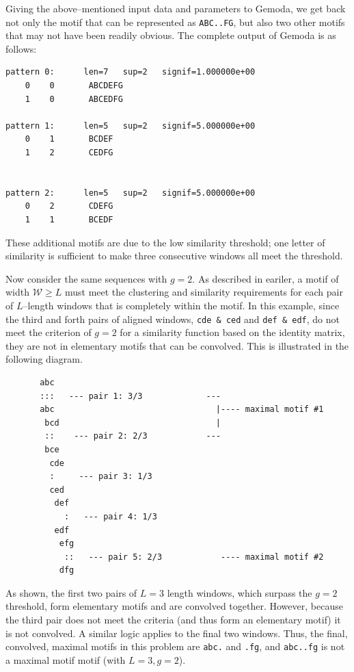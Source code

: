     Giving the above--mentioned input data and parameters to Gemoda, we get
    back not only the motif that can be represented as \texttt{ABC..FG}, but
    also two other motifs that may not have been readily obvious.  The
    complete output of Gemoda is as follows:

    \begin{verbatim}
pattern 0:      len=7   sup=2   signif=1.000000e+00
    0    0       ABCDEFG
    1    0       ABCEDFG

pattern 1:      len=5   sup=2   signif=5.000000e+00
    0    1       BCDEF
    1    2       CEDFG


pattern 2:      len=5   sup=2   signif=5.000000e+00
    0    2       CDEFG
    1    1       BCEDF
\end{verbatim}

    These additional motifs are due to the low similarity threshold;
    one letter of similarity is sufficient to make three consecutive
    windows all meet the threshold.

    Now consider the same sequences with $g = 2$.
    As described
    in eariler, a motif of width $\mathscr{W}
    \ge L$ must meet the clustering and similarity
    requirements for each pair of $L$--length windows
    that is completely within the motif.  In this example,
    since the third and forth pairs of aligned windows,
    \texttt{cde \& ced} and \texttt{def \& edf}, do
    not meet the criterion of $g = 2$ for a similarity
    function based on the identity matrix, they are not
    in elementary motifs that can be convolved.  This is
    illustrated in the following diagram.

    \begin{verbatim}
       abc
       :::   --- pair 1: 3/3             ---
       abc                                 |---- maximal motif #1
        bcd                                |
        ::    --- pair 2: 2/3            ---
        bce
         cde
         :     --- pair 3: 1/3
         ced
          def
            :   --- pair 4: 1/3
          edf
           efg
            ::   --- pair 5: 2/3            ---- maximal motif #2
           dfg
    \end{verbatim}

    As shown, the first two pairs of $L=3$ length windows,
    which surpass the $g=2$ threshold, form elementary
    motifs and are convolved together.  However, because
    the third pair does not meet the criteria (and thus
    form an elementary motif) it is not convolved.
    A similar logic applies to the final two windows.
    Thus, the final, convolved, maximal motifs in this
    problem are \texttt{abc.} and \texttt{.fg}, and
    \texttt{abc..fg} is not a maximal motif motif (with $L=3,g=2$).


